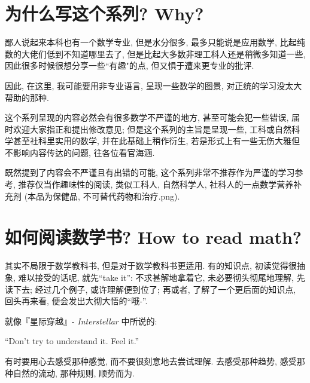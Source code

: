 \section{为什么写这个系列? Why?}
{\small
鄙人说起来本科也有一个数学专业, 但是水分很多, 最多只能说是应用数学, 比起纯数的大佬们低到不知道哪里去了, 但是比起大多数非理工科人还是稍微多知道一些, 因此很多时候很想分享一些``有趣"的点, 但又惧于遭来更专业的批评.

因此, 在这里, 我可能要用非专业语言, 呈现一些数学的图景, 对正统的学习没太大帮助的那种.

这个系列呈现的内容必然会有很多数学不严谨的地方, 甚至可能会犯一些错误, 届时欢迎大家指正和提出修改意见; 但是这个系列的主旨是呈现一些, 工科或自然科学甚至社科里实用的数学, 并在此基础上稍作衍生, 若是形式上有一些无伤大雅但不影响内容传达的问题, 往各位看官海涵.

既然提到了内容会不严谨且有出错的可能, 这个系列非常不推荐作为严谨的学习参考, 推荐仅当作趣味性的阅读, 类似工科人, 自然科学人, 社科人的一点数学营养补充剂 (本品为保健品, 不可替代药物和治疗.png).}

\section{如何阅读数学书? How to read math?}
{\small
其实不局限于数学教科书, 但是对于数学教科书更适用. 有的知识点, 初读觉得很抽象, 难以接受的话呢, 就先``take it'': 不求甚解地拿着它, 未必要彻头彻尾地理解, 先读下去; 经过几个例子, 或许理解便到位了; 再或者, 了解了一个更后面的知识点, 回头再来看, 便会发出大彻大悟的``哦-''.

就像『星际穿越』- \textit{Interstellar} 中所说的:
\begin{newquote}
    ``Don't try to understand it. Feel it.''
\end{newquote}
有时要用心去感受那种感觉, 而不要很刻意地去尝试理解. 去感受那种趋势, 感受那种自然的流动, 那种规则, 顺势而为.}